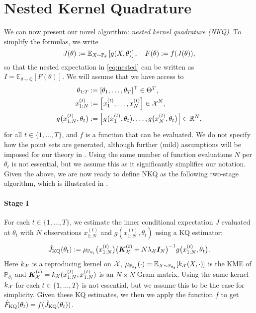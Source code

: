 \section{Nested Kernel Quadrature}\label{sec:methodology}

We can now present our novel algorithm: \emph{nested kernel quadrature (NKQ)}.
To simplify the formulas, we write
\begin{equation}\label{eq:J_F_defi}
    J(\theta) := \operatorname{\mathbb{E}}_{X \sim \mathbb{P}_\theta} \left[ g(X, \theta) \right], \quad F(\theta) := f(J(\theta)),  
\end{equation}
so that the nested expectation in \eqref{eq:nested} can be written as $I = \mathbb{E}_{\theta \sim \mathbb{Q}}[F(\theta)]$. We will assume that we have access to
\begin{align*}
  \theta_{1:T} & := [\theta_1,\ldots,\theta_T]^\top \in \Theta^T, \\
  x_{1:N}^{(t)} & := \Big[x_{1}^{(t)},\ldots,x_{N}^{(t)} \Big] \in \mathcal{X}^N,\\
  g\big(x_{1:N}^{(t)},\theta_t \big) & := \Big[ g\big(x_{1}^{(t)},\theta_t \big), \ldots, g\big(x_{N}^{(t)},\theta_t \big)\Big]  \in \mathbb{R}^N,
\end{align*}
for all $t \in \{1, \ldots, T\}$, and $f$ is a function that can be evaluated.
We do not specify how the point sets are generated, although further (mild) assumptions will be imposed for our theory in . Using the same number of function evaluations $N$ per $\theta_t$ is not essential, but we assume this as it significantly simplifies our notation. 
Given the above, we are now ready to define NKQ as the following two-stage algorithm, which is illustrated in .

\paragraph{Stage I}
For each $t \in \{1, \ldots, T\}$, we estimate the inner conditional expectation $J$ evaluated at $\theta_t$ with $N$ observations $x_{1:N}^{(t)}$ and $g(x_{1:N}^{(t)},\theta_t)$ using a KQ estimator: 
\begin{equation}\label{eq:F_J_KQ}
\hat{J}_{\text{KQ}} (\theta_t) :=\mu_{\mathbb{P}_{ \theta_t} } \big(x_{1:N}^{(t)} \big) \big( \boldsymbol{K}_{\mathcal{X}}^{(t)} + N \lambda_{\mathcal{X}} \boldsymbol{I}_N \big)^{-1} g \big(x_{1:N}^{(t)}, \theta_t \big) .
\end{equation}
Here $k_{\mathcal{X}}$ is a reproducing kernel on $\mathcal{X}$, $\mu_{\mathbb{P}_{\theta_t}}(\cdot) = \mathbb{E}_{X \sim \mathbb{P}_{\theta_t}}[k_{\mathcal{X}}(X, \cdot)]$ is the KME of $\mathbb{P}_{\theta_t}$ and $\boldsymbol{K}_{\mathcal{X}}^{(t)} = k_{\mathcal{X}}(x_{1:N}^{(t)}, x_{1:N}^{(t)})$ is an $N \times N$ Gram matrix. 
Using the same kernel $k_{\mathcal{X}}$ for each $t\in \{1, \ldots, T\}$ is not essential, but we assume this to be the case for simplicity.
Given these KQ estimates, we then we apply the function $f$ to get $\hat{F}_{\text{KQ}}(\theta_t) = f(\hat{J}_{\text{KQ}} (\theta_t))$. 

